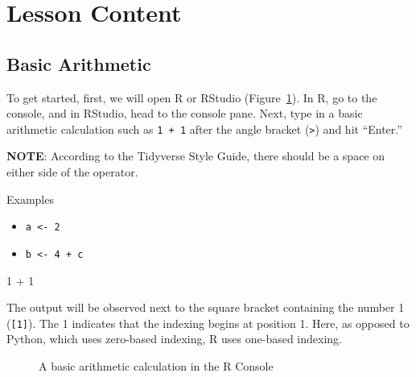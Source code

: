 \documentclass[
  letterpaper,
  DIV=11,
  numbers=noendperiod]{scrreprt}
\newenvironment{Shaded}{}{}
\newcommand{\DecValTok}[1]{\textcolor[rgb]{0.00,0.36,0.77}{#1}}
\newcommand{\SpecialCharTok}[1]{\textcolor[rgb]{0.00,0.36,0.77}{#1}}
\providecommand{\tightlist}{%
  \setlength{\itemsep}{0pt}\setlength{\parskip}{0pt}}\usepackage{longtable,booktabs,array}
\begin{document}
\section{Lesson Content}\label{lesson-content-5}

\subsection{Basic Arithmetic}\label{basic-arithmetic}

To get started, first, we will open R or RStudio
(Figure~\ref{fig-arithmetic-1}). In R, go to the console, and in
RStudio, head to the console pane. Next, type in a basic arithmetic
calculation such as \texttt{1\ +\ 1} after the angle bracket
(\texttt{\textgreater{}}) and hit ``Enter.''

\textbf{NOTE}: According to the Tidyverse Style Guide, there should be a
space on either side of the operator.

Examples

\begin{itemize}
\tightlist
\item
  \texttt{a\ \textless{}-\ 2}
\item
  \texttt{b\ \textless{}-\ 4\ +\ c}
\end{itemize}

\begin{Shaded}
\begin{Highlighting}[]
\DecValTok{1} \SpecialCharTok{+} \DecValTok{1}
\end{Highlighting}
\end{Shaded}

The output will be observed next to the square bracket containing the
number 1 (\texttt{{[}1{]}}). The 1 indicates that the indexing begins at
position 1. Here, as opposed to Python, which uses zero-based indexing,
R uses one-based indexing.

\begin{figure}


\caption{\label{fig-arithmetic-1}A basic arithmetic calculation in the R
Console}

\end{figure}%
\end{document}

